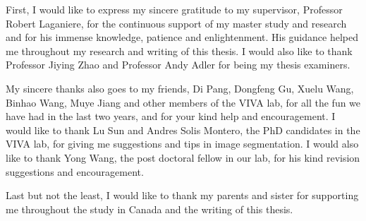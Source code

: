 \documentclass[
12pt, %
oneside, %
english, %
singlespacing, %
headsepline, %
]{MastersDoctoralThesis} %
\begin{document}
\begin{acknowledgements}
\addchaptertocentry{\acknowledgementname} %
First, I would like to express my sincere gratitude to my supervisor, Professor Robert Laganiere, for the continuous support of my master study and research and for his immense knowledge, patience and enlightenment. His guidance helped me throughout my research and writing of this thesis. I would also like to thank Professor Jiying Zhao and Professor Andy Adler for being my thesis examiners.

My sincere thanks also goes to my friends, Di Pang, Dongfeng Gu, Xuelu Wang, Binhao Wang, Muye Jiang and other members of the VIVA lab, for all the fun we have had in the last two years, and for your kind help and encouragement. I would like to thank Lu Sun and Andres Solis Montero, the PhD candidates in the VIVA lab, for giving me suggestions and tips in image segmentation. I would also like to thank Yong Wang, the post doctoral fellow in our lab, for his kind revision suggestions and encouragement. 

Last but not the least, I would like to thank my parents and sister for supporting me throughout the study in Canada and the writing of this thesis.
\end{acknowledgements}


\tableofcontents %

\listoffigures %

\listoftables %


%
%
\end{document}
